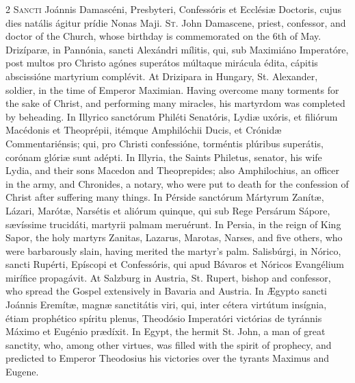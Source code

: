 \begin{paracol}{2}
\lettrine[lines=2]{S}{ancti} Joánnis Damascéni, Presbyteri, Confessóris et Ecclésiæ 
 Doctoris, cujus dies natális ágitur prídie Nonas Maji.
\switchcolumn
{}
\lettrine[lines=2]{S}{t.} John Damascene, priest, confessor, and doctor of the Church, whose 
 birthday is commemorated on the 6th of May.
\switchcolumn*
{}
Drizíparæ, 
 in Pannónia, sancti Alexándri mílitis, qui, sub Maximiáno Imperatóre, post 
 multos pro Christo agónes superátos múltaque mirácula édita, cápitis 
 abscissióne martyrium complévit.
\switchcolumn
{}
At Drizipara in Hungary, St. Alexander, soldier, in the time of Emperor 
 Maximian. Having overcome many torments for the sake of Christ, and 
 performing many miracles, his martyrdom was completed by beheading.
\switchcolumn*
{}
In Illyrico sanctórum Philéti Senatóris, Lydiæ 
 uxóris, et filiórum Macédonis et Theoprépii, itémque Amphilóchii Ducis, et 
 Crónidæ Commentariénsis; qui, pro Christi confessióne, torméntis plúribus 
 superátis, corónam glóriæ sunt adépti.
\switchcolumn
{}
In Illyria, the Saints Philetus, senator, his wife Lydia, and their sons 
 Macedon and Theoprepides; also Amphilochius, an officer in the army, and 
 Chronides, a notary, who were put to death for the confession of Christ 
 after suffering many things.
\switchcolumn*
{}
In Pérside sanctórum Mártyrum Zanítæ, Lázari, 
 Marótæ, Narsétis et aliórum quinque, qui sub Rege Persárum Sápore, sævíssime 
 trucidáti, martyrii palmam meruérunt.
\switchcolumn
{}
In Persia, in the reign of King Sapor, the holy martyrs Zanitas, Lazarus, 
 Marotas, Narses, and five others, who were barbarously slain, having merited 
 the martyr's palm.
\switchcolumn*
{}
Salisbúrgi, in Nórico, sancti Rupérti, Epíscopi 
 et Confessóris, qui apud Bávaros et Nóricos Evangélium mirífice propagávit.
\switchcolumn
{}
At Salzburg in Austria, St. Rupert, bishop and confessor, who spread the 
 Gospel extensively in Bavaria and Austria.
\switchcolumn*
{}
In Ægypto sancti Joánnis Eremítæ, magnæ 
 sanctitátis viri, qui, inter cétera virtútum insígnia, étiam prophético 
 spíritu plenus, Theodósio Imperatóri victórias de tyránnis Máximo et Eugénio 
 prædíxit.
\switchcolumn
{}
In Egypt, the hermit St. John, a man of great sanctity, who, among other 
 virtues, was filled with the spirit of prophecy, and predicted to Emperor 
 Theodosius his victories over the tyrants Maximus and Eugene.
\switchcolumn*
{}
\end{paracol}


